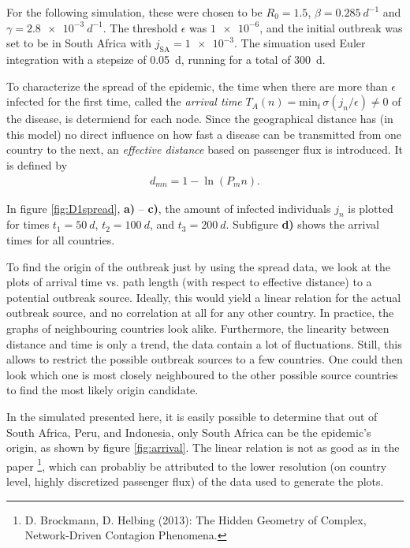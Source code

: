 \documentclass{scrartcl}
\begin{document}
For the following simulation, these were chosen to be $R_0 = 1.5$, $\beta = \SI{0.285}{d^{-1}}$ and $\gamma = \SI{2.8e-3}{d^{-1}}$.
The threshold $\epsilon$ was $\num{1e-6}$, and the initial outbreak was set to be in South Africa with $j_{\mathrm{SA}} = \num{1e-3}$. The simuation used Euler integration with a stepsize of \SI{0.05}{d}, running for a total of \SI{300}{d}.

To characterize the spread of the epidemic, the time when there are more than $\epsilon$ infected for the first time, called the \emph{arrival time} $T_A(n) = \mathrm{min}_t \, \sigma(j_n / \epsilon) \neq 0$ of the disease, is determiend for each node. Since the geographical distance has (in this model) no direct influence on how fast a disease can be transmitted from one country to the next, an \emph{effective distance} based on passenger flux is introduced. It is defined by
\begin{align}
	d_{mn} = 1 - \ln (P_mn). \label{eq:epl}
\end{align}

In figure \ref{fig:D1spread}, \textbf{a)} -- \textbf{c)}, the amount of infected individuals $j_n$ is plotted for times $t_1=\SI{50}{d}$, $t_2 = \SI{100}{d}$, and $t_3 = \SI{200}{d}$. Subfigure \textbf{d)} shows the arrival times for all countries.

To find the origin of the outbreak just by using the spread data, we look at the plots of arrival time vs. path length (with respect to effective distance) to a potential outbreak source. 
Ideally, this would yield a linear relation for the actual outbreak source, and no correlation at all for any other country. In practice, the graphs of neighbouring countries look alike. 
Furthermore, the linearity between distance and time is only a trend, the data contain a lot of fluctuations.
Still, this allows to restrict the possible outbreak sources to a few countries. One could then look which one is most closely neighboured to the other possible source countries to find the most likely origin candidate.

In the simulated presented here, it is easily possible to determine that out of South Africa, Peru, and Indonesia, only South Africa can be the epidemic's origin, as shown by figure \ref{fig:arrival}. The linear relation is not as good as in the paper \footnote{D. Brockmann, D. Helbing (2013): The Hidden Geometry of Complex, Network-Driven Contagion Phenomena.}, which can probabliy be attributed to the lower resolution (on country level, highly discretized passenger flux) of the data used to generate the plots.
\end{document}
